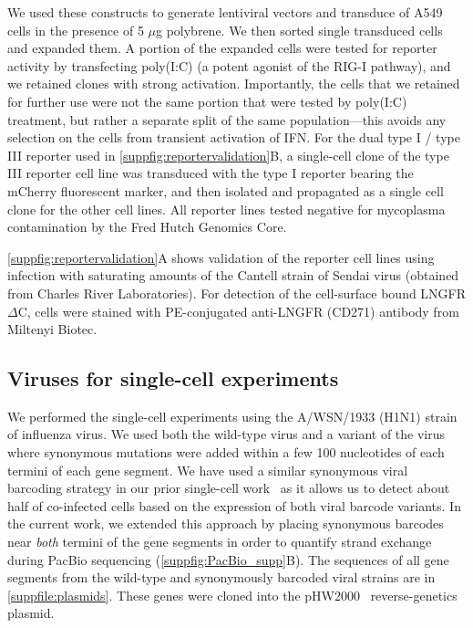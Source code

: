 \documentclass[10pt,letterpaper]{article}
\newcommand{\SUPPFILE}[1]{\autoref{suppfile:#1}}
\newcommand{\SUPPFIG}[1]{\autoref{suppfig:#1}}
\begin{document}
We used these constructs to generate lentiviral vectors and transduce of A549 cells in the presence of 5 $\mu$g polybrene.
We then sorted single transduced cells and expanded them.
A portion of the expanded cells were tested for reporter activity by transfecting poly(I:C) (a potent agonist of the RIG-I pathway), and we retained clones with strong activation.
Importantly, the cells that we retained for further use were not the same portion that were tested by poly(I:C) treatment, but rather a separate split of the same population---this avoids any selection on the cells from transient activation of IFN.
For the dual type I / type III reporter used in \SUPPFIG{reportervalidation}B, a single-cell clone of the type III reporter cell line was transduced with the type I reporter bearing the mCherry fluorescent marker, and then isolated and propagated as a single cell clone for the other cell lines.
All reporter lines tested negative for mycoplasma contamination by the Fred Hutch Genomics Core.

\SUPPFIG{reportervalidation}A shows validation of the reporter cell lines using infection with saturating amounts of the Cantell strain of Sendai virus (obtained from Charles River Laboratories).
For detection of the cell-surface bound LNGFR$\Delta$C, cells were stained with PE-conjugated anti-LNGFR (CD271) antibody from Miltenyi Biotec.

\subsection*{Viruses for single-cell experiments}
We performed the single-cell experiments using the A/WSN/1933 (H1N1) strain of influenza virus.
We used both the wild-type virus and a variant of the virus where synonymous mutations were added within a few 100 nucleotides of each termini of each gene segment.
We have used a similar synonymous viral barcoding strategy in our prior single-cell work~\citep{russell2018extreme} as it allows us to detect about half of co-infected cells based on the expression of both viral barcode variants.
In the current work, we extended this approach by placing synonymous barcodes near \emph{both} termini of the gene segments in order to quantify strand exchange during PacBio sequencing (\SUPPFIG{PacBio_supp}B).
The sequences of all gene segments from the wild-type and synonymously barcoded viral strains are in \SUPPFILE{plasmids}.
These genes were cloned into the pHW2000~\citep{hoffmann2000dna} reverse-genetics plasmid.
\end{document}
